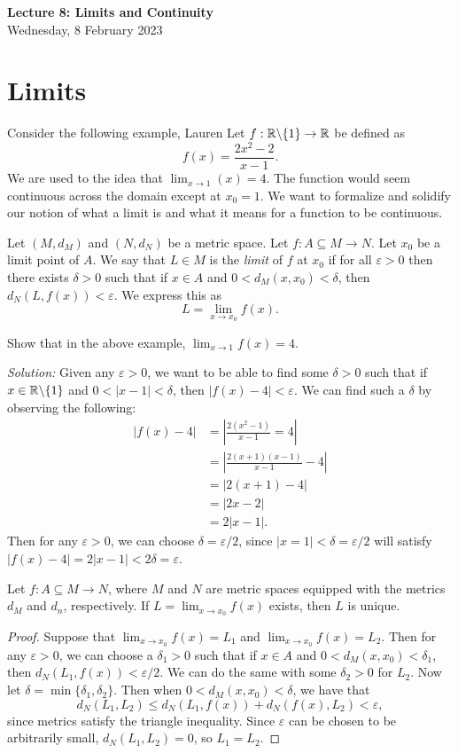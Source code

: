 \documentclass[11pt]{article}
\theoremstyle{definition}
\newcommand{\R}{\mathbb{R}}                      %
\newcommand{\bslash}{\symbol{92}}
\begin{document}
\thispagestyle{empty}

\begin{center}
{\LARGE \bf Lecture 8: Limits and Continuity}\\
{\large Wednesday, 8 February 2023}\\

\end{center}

\section{Limits}
Consider the following example, Lauren
\ex Let $f:\R\bslash\{1\}\to\R$ be defined as
$$
f(x)=\frac{2x^2-2}{x-1}.
$$
We are used to the idea that $\lim_{x\to1} (x)=4$. The function would seem continuous across the domain except at $x_0=1$. We want to formalize and solidify our notion of what a limit is and what it means for a function to be continuous.

 Let $(M,d_M)$ and $(N,d_N)$ be a metric space. Let $f:A\subseteq M\to N$. Let $x_0$ be a limit point of $A$. We say that $L\in M$ is the \textit{limit} of $f$ at $x_0$ if for all $\varepsilon>0$ then there exists $\delta>0$ such that if $x\in A$ and $0<d_M(x,x_0)<\delta$, then $d_N(L,f(x))<\varepsilon$. We express this as 
$$
L=\lim_{x\to x_0}f(x).
$$

\ex Show that in the above example, $\lim_{x\to 1}f(x)=4$.

\textit{Solution:} Given any $\varepsilon>0$, we want to be able to find some $\delta>0$ such that if $x\in \R\bslash\{1\}$ and $0<|x-1|<\delta$, then $|f(x)-4|<\varepsilon$. We can find such a $\delta$ by observing the following:
\begin{align*}
    |f(x)-4|&=\left|\frac{2(x^2-1)}{x-1}=4\right|\\
    &=\left|\frac{2(x+1)(x-1)}{x-1}-4\right|\\
    &=|2(x+1)-4|\\
    &=|2x-2|\\
    &=2|x-1|.
\end{align*}
Then for any $\varepsilon>0$, we can choose $\delta=\varepsilon/2$, since $|x=1|<\delta=\varepsilon/2$ will satisfy $|f(x)-4|=2|x-1|<2\delta=\varepsilon$.


\prop Let $f:A\subseteq M\to N$, where $M$ and $N$ are metric spaces equipped with the metrics $d_M$ and $d_n$, respectively. If $L=\lim_{x\to x_0} f(x)$ exists, then $L$ is unique. 

\begin{proof}
    Suppose that $\lim_{x\to x_0}f(x)=L_1$ and $\lim_{x\to x_0}f(x)=L_2$. Then for any $\varepsilon>0$, we can choose a $\delta_1>0$ such that if $x\in A$ and $0<d_M(x,x_0)<\delta_1$, then $d_N(L_1,f(x))<\varepsilon/2$. We can do the same with some $\delta_2>0$ for $L_2$. Now let $\delta=\min\{\delta_1,\delta_2\}$. Then when $0<d_M(x,x_0)<\delta$, we have that
    $$
    d_N(L_1,L_2)\leq d_N(L_1,f(x))+d_N(f(x),L_2)<\varepsilon,
    $$
    since metrics satisfy the triangle inequality. Since $\varepsilon$ can be chosen to be arbitrarily small, $d_N(L_1,L_2)=0$, so $L_1=L_2$.
\end{proof}
\end{document}
